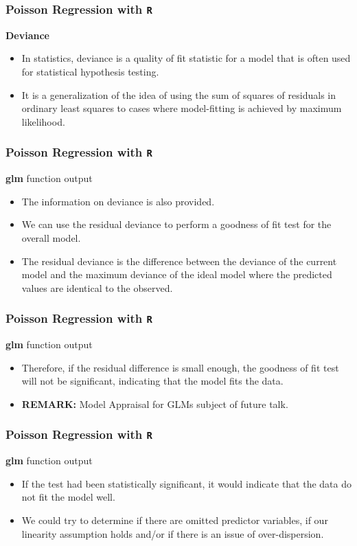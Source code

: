 \documentclass[00-GLMregslides.tex]{subfiles}
\begin{document}
\begin{frame}[fragile]
\frametitle{Poisson Regression with \texttt{R}}
\Large 
\textbf{Deviance}
\begin{itemize}
\item In statistics, deviance is a quality of fit statistic for a model that is often used for statistical 
hypothesis testing. 
\item It is a generalization of the idea of using the sum of squares of 
residuals in ordinary least squares to cases where model-fitting is achieved by maximum likelihood.
\end{itemize}
\end{frame}
\begin{frame}[fragile]
\frametitle{Poisson Regression with \texttt{R}}
\Large 
\textbf{glm} function output
\begin{itemize}
\item The information on deviance is also provided. 
\item We can use the residual deviance to perform a goodness of fit test for the overall model. 
\item The residual deviance is the difference between the deviance of the current model and the maximum deviance of the ideal model where the predicted values are identical to the observed. 
\end{itemize}
\end{frame}
\begin{frame}[fragile]
\frametitle{Poisson Regression with \texttt{R}}
\Large 
\textbf{glm} function output
\begin{itemize}
\item Therefore, if the residual difference is small enough, the goodness of fit test will not be significant, indicating that the model fits the data. 

\item \textbf{REMARK:} Model Appraisal for GLMs subject of future talk.
\end{itemize}
\end{frame}
\begin{frame}[fragile]
	\frametitle{Poisson Regression with \texttt{R}}
	\Large 
	\textbf{glm} function output
	\begin{itemize}
\item If the test had been statistically significant, it would indicate that the data do not fit the model well. 
\item We could try to determine if there are omitted predictor variables, if our linearity assumption holds and/or if there is an issue of over-dispersion. 
\end{itemize}
\end{frame}
\end{document}
